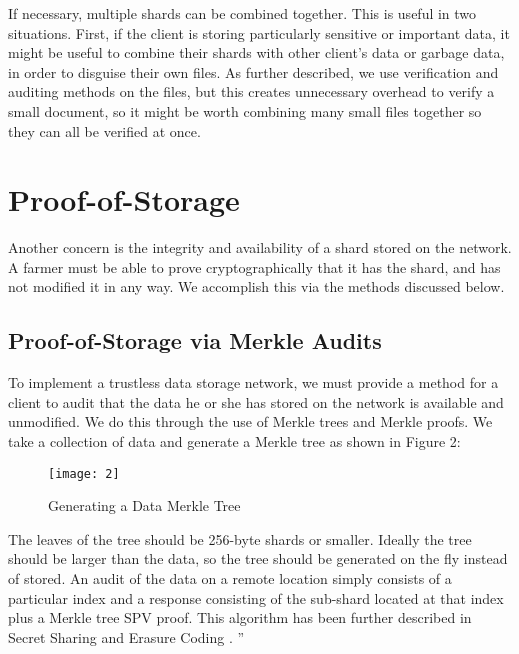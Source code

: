 \documentclass[a4paper,10pt]{article}
\begin{document}
If necessary, multiple shards can be combined together. This is useful in two situations. First, if the client is storing particularly sensitive or important data, it might be useful to combine their shards with other client’s data or garbage data, in order to disguise their own files. As further described, we use verification and auditing methods on the files, but this creates unnecessary overhead to verify a small document, so it might be worth combining many small files together so they can all be verified at once.



\section{Proof-of-Storage}

Another concern is the integrity and availability of a shard stored on the network. A farmer must be able to prove cryptographically that it has the shard, and has not modified it in any way. We accomplish this via the methods discussed below.
\subsection{Proof-of-Storage via Merkle Audits}

To implement a trustless data storage network, we must provide a method for a client to audit that the data he or she has stored on the network is available and unmodified. We do this through the use of Merkle trees \cite{2} and Merkle proofs. We take a collection of data and generate a Merkle tree as shown in Figure 2:\\

\begin{figure}[hbt]
\centering
\texttt{[image: 2]}
\caption{Generating a Data Merkle Tree}
\end{figure}

 The leaves of the tree should be 256-byte shards or smaller. Ideally the tree should be larger than the data, so the tree should be generated on the fly instead of stored. An audit of the data on a remote location simply consists of a particular index and a response consisting of the sub-shard located at that index plus a Merkle tree SPV proof. This algorithm has been further described in Secret
Sharing and Erasure Coding \cite{16}. ”  \\
\end{document}
